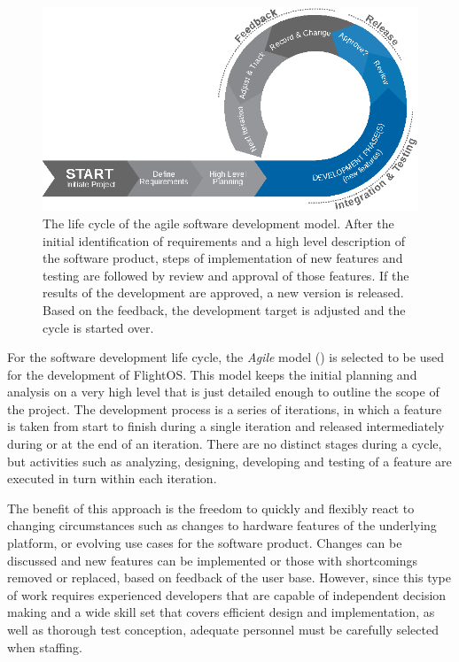 \begin{figure}[htb]
\begin{center}
	\includegraphics[width=\columnwidth]{images/agile_sw_dev}
	\caption{The life cycle of the agile software development model.
		 After the initial identification of requirements and a high
		 level description of the software product, steps of
		 implementation of new features and testing are followed
		 by review and approval of those features. If the results
		 of the development are approved, a new version is released.
		 Based on the feedback, the development target is adjusted and
		 the cycle is started over.}
	\label{fig:agile_sw}
\end{center}
\end{figure}

\noindent
For the software development life cycle, the \emph{Agile} model ()
is selected to be used for the development of FlightOS.
This model keeps the initial planning and analysis on a very high level that
is just detailed enough to outline the scope of the project. The development
process is a series of iterations, in which a feature is taken from start to
finish during a single iteration and released intermediately during or at the
end of an iteration.
There are no distinct stages during a cycle, but activities
such as analyzing, designing, developing and testing of a feature are executed
in turn within each iteration.

The benefit of this approach is the freedom to quickly and flexibly react to
changing circumstances such as changes to hardware features of the underlying
platform, or evolving use cases for the software product. Changes can be
discussed and new features can be implemented or those with shortcomings removed
or replaced, based on feedback of the user base.
However, since this type of
work requires experienced developers that are capable of independent decision
making and a wide skill set that covers efficient design and implementation, as
well as thorough test conception, adequate personnel must be carefully selected
when staffing.



